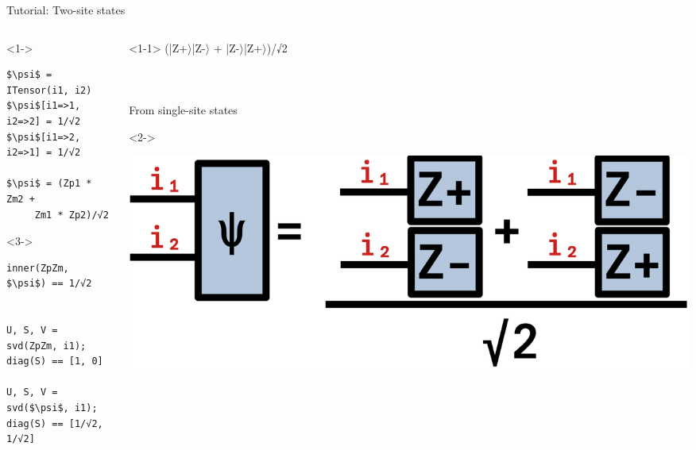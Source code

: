 \begin{frame}[fragile]{Tutorial: Two-site states}

\begin{columns}

\begin{column}{5cm}

\begin{onlyenv}<1->
\begin{lstlisting}[language=JuliaLocal, style=julia, mathescape, basicstyle=\scriptsize\ttfamily]
$\psi$ = ITensor(i1, i2)
$\psi$[i1=>1, i2=>2] = 1/√2
$\psi$[i1=>2, i2=>1] = 1/√2

$\psi$ = (Zp1 * Zm2 +
     Zm1 * Zp2)/√2
\end{lstlisting}
\end{onlyenv}

\begin{onlyenv}<3->
\begin{lstlisting}[language=JuliaLocal, style=julia, mathescape, basicstyle=\scriptsize\ttfamily]
inner(ZpZm, $\psi$) == 1/√2


U, S, V = svd(ZpZm, i1);
diag(S) == [1, 0]

U, S, V = svd($\psi$, i1);
diag(S) == [1/√2, 1/√2]
\end{lstlisting}
\end{onlyenv}

\end{column}

\begin{column}{5cm}

\begin{onlyenv}<1-1>
(|Z+$\rangle$|Z-$\rangle$ + |Z-$\rangle$|Z+$\rangle$)/√2 \\
~\\
~\\
~\\
From single-site states \\
\end{onlyenv}

\begin{onlyenv}<2->
\vspace*{0.0cm}
\begin{center}
\includegraphics[width=1.0\textwidth]{
  slides/assets/cat12.png
}
\end{center}
\vspace*{0.0cm}
\end{onlyenv}


\end{column}
\end{columns}
\end{frame}
